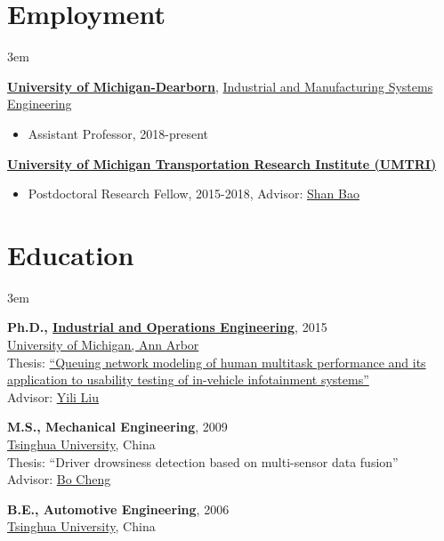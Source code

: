 \documentclass[11pt]{article}
\newenvironment{main}
{\begin{adjustwidth}{3em}{}}
{\end{adjustwidth}}
\begin{document}
\section*{Employment}
\begin{main}

\href{https://umdearborn.edu/}{\textbf{University of Michigan-Dearborn}},
\href{https://umdearborn.edu/cecs/departments/industrial-and-manufacturing-systems-engineering}{Industrial and Manufacturing Systems Engineering}

\begin{itemize}
    \item[] Assistant Professor, 2018-present
\end{itemize}

\href{http://www.umtri.umich.edu/}{\textbf{University of Michigan Transportation Research Institute (UMTRI)}}

\begin{itemize}
    \item[] Postdoctoral Research Fellow, 2015-2018, Advisor: \href{https://sites.google.com/umich.edu/hfet-lab/people}{Shan Bao}
\end{itemize}


\end{main}
\section*{Education}
\begin{main}

\textbf{Ph.D., \href{https://ioe.engin.umich.edu/}{Industrial and Operations Engineering}}, 2015\\
\href{https://umich.edu/}{University of Michigan, Ann Arbor}\\
Thesis: \href{https://deepblue.lib.umich.edu/handle/2027.42/113590}{``Queuing network modeling of human multitask performance and its application to usability testing of in-vehicle infotainment systems''}\\
Advisor: \href{https://ioe.engin.umich.edu/people/yili-liu/}{Yili Liu}

\textbf{M.S., Mechanical Engineering}, 2009\\
\href{https://www.tsinghua.edu.cn/en/index.htm}{Tsinghua University}, China\\
Thesis: ``Driver drowsiness detection based on multi-sensor data fusion''\\
Advisor: \href{http://www.svm.tsinghua.edu.cn/essay/80/1799.html}{Bo Cheng}

\textbf{B.E., Automotive Engineering}, 2006\\
\href{https://www.tsinghua.edu.cn/en/index.htm}{Tsinghua University}, China


\end{main}
\end{document}
